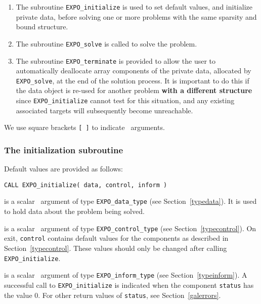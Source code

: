 \documentclass{galahad}
\newcommand{\packagename}{EXPO}
\begin{document}
\begin{enumerate}
\item The subroutine
      {\tt \packagename\_initialize}
      is used to set default values, and initialize private data,
      before solving one or more problems with the
      same sparsity and bound structure.
\item The subroutine
      {\tt \packagename\_solve}
      is called to solve the problem.
\item The subroutine
      {\tt \packagename\_terminate}
      is provided to allow the user to automatically deallocate array
       components of the private data, allocated by
       {\tt \packagename\_solve},
       at the end of the solution process.
       It is important to do this if the data object is re-used for another
       problem {\bf with a different structure}
       since {\tt \packagename\_initialize} cannot test for this situation,
       and any existing associated targets will subsequently become unreachable.
\end{enumerate}
We use square brackets {\tt [ ]} to indicate \optional\ arguments.


\subsubsection{The initialization subroutine}\label{subinit}
 Default values are provided as follows:
\vspace*{1mm}

\hspace{8mm}
{\tt CALL \packagename\_initialize( data, control, inform )}

\vspace*{-2mm}
\begin{description}

 is a scalar \intentinout\ argument of type
{\tt \packagename\_data\_type}
(see Section~\ref{typedata}). It is used to hold data about the problem being
solved.

 is a scalar \intentout\ argument of type
{\tt \packagename\_control\_type}
(see Section~\ref{typecontrol}).
On exit, {\tt control} contains default values for the components as
described in Section~\ref{typecontrol}.
These values should only be changed after calling
{\tt \packagename\_initialize}.

 is a scalar \intentout\ argument of type
{\tt \packagename\_inform\_type}
(see Section~\ref{typeinform}). A successful call to
{\tt \packagename\_initialize}
is indicated when the  component {\tt status} has the value 0.
For other return values of {\tt status}, see Section~\ref{galerrors}.

\end{description}
\end{document}
